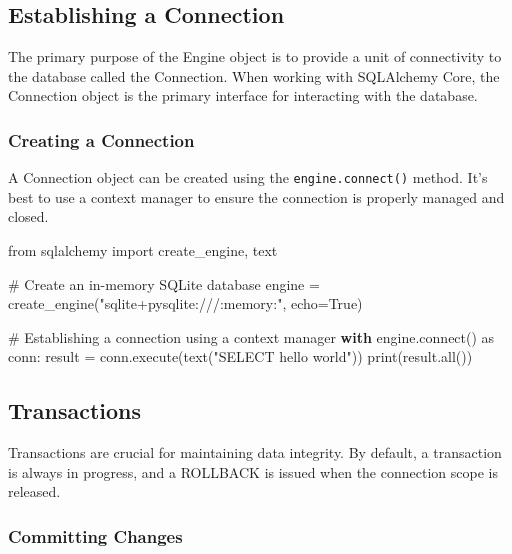 \documentclass[
  letterpaper,
  DIV=11,
  numbers=noendperiod]{scrreprt}
\newenvironment{Shaded}{\begin{snugshade}}{\end{snugshade}}
\newcommand{\BuiltInTok}[1]{\textcolor[rgb]{0.00,0.23,0.31}{#1}}
\newcommand{\CommentTok}[1]{\textcolor[rgb]{0.37,0.37,0.37}{#1}}
\newcommand{\ControlFlowTok}[1]{\textcolor[rgb]{0.00,0.23,0.31}{\textbf{#1}}}
\newcommand{\ExtensionTok}[1]{\textcolor[rgb]{0.00,0.23,0.31}{#1}}
\newcommand{\ImportTok}[1]{\textcolor[rgb]{0.00,0.46,0.62}{#1}}
\newcommand{\NormalTok}[1]{\textcolor[rgb]{0.00,0.23,0.31}{#1}}
\newcommand{\OperatorTok}[1]{\textcolor[rgb]{0.37,0.37,0.37}{#1}}
\newcommand{\StringTok}[1]{\textcolor[rgb]{0.13,0.47,0.30}{#1}}
\newcommand{\VariableTok}[1]{\textcolor[rgb]{0.07,0.07,0.07}{#1}}
\begin{document}
\subsection{Establishing a Connection}\label{establishing-a-connection}

The primary purpose of the Engine object is to provide a unit of
connectivity to the database called the Connection. When working with
SQLAlchemy Core, the Connection object is the primary interface for
interacting with the database.

\subsubsection{Creating a Connection}\label{creating-a-connection}

A Connection object can be created using the \texttt{engine.connect()}
method. It's best to use a context manager to ensure the connection is
properly managed and closed.

\begin{Shaded}
\begin{Highlighting}[]
\ImportTok{from}\NormalTok{ sqlalchemy }\ImportTok{import}\NormalTok{ create\_engine, text}

\CommentTok{\# Create an in{-}memory SQLite database}
\NormalTok{engine }\OperatorTok{=}\NormalTok{ create\_engine(}\StringTok{"sqlite+pysqlite:///:memory:"}\NormalTok{, echo}\OperatorTok{=}\VariableTok{True}\NormalTok{)}

\CommentTok{\# Establishing a connection using a context manager}
\ControlFlowTok{with}\NormalTok{ engine.}\ExtensionTok{connect}\NormalTok{() }\ImportTok{as}\NormalTok{ conn:}
\NormalTok{    result }\OperatorTok{=}\NormalTok{ conn.execute(text(}\StringTok{"SELECT \textquotesingle{}hello world\textquotesingle{}"}\NormalTok{))}
    \BuiltInTok{print}\NormalTok{(result.}\BuiltInTok{all}\NormalTok{())}
\end{Highlighting}
\end{Shaded}

\subsection{Transactions}\label{transactions}

Transactions are crucial for maintaining data integrity. By default, a
transaction is always in progress, and a ROLLBACK is issued when the
connection scope is released.

\subsubsection{Committing Changes}\label{committing-changes}
\end{document}
